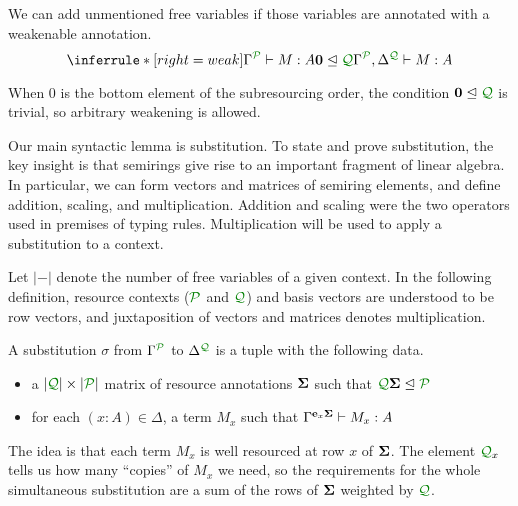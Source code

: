 \begin{lemma}[Weakening]
  \label{lem:weak}
  We can add unmentioned free variables if those variables are annotated with a
  weakenable annotation.
  \[
    \inferrule*[right=weak]{
      \ctx{\Gamma}{P} \vdash M : A
      \\ \vct 0 \subres \resctx Q
    }
    {
      \ctx{\Gamma}{P}, \ctx{\Delta}{Q} \vdash M : A
    }
  \]
\end{lemma}

When $0$ is the bottom element of the subresourcing order, the condition $\vct 0
\subres \resctx Q$ is trivial, so arbitrary weakening is allowed.

Our main syntactic lemma is substitution.
To state and prove substitution, the key insight is that semirings give rise to
an important fragment of linear algebra.
In particular, we can form vectors and matrices of semiring elements, and define
addition, scaling, and multiplication.
Addition and scaling were the two operators used in premises of typing rules.
Multiplication will be used to apply a substitution to a context.


Let $|-|$ denote the number of free variables of a given context.
In the following definition, resource contexts ($\resctx P$ and $\resctx Q$) and
basis vectors are understood to be row vectors, and juxtaposition of vectors and
matrices denotes multiplication.

\begin{definition}
  A substitution $\sigma$ from $\Gamma^{\resctx P}$ to
  $\Delta^{\resctx Q}$ is a tuple with the following data.

  \begin{itemize}
  \item a $|\resctx Q| \times |\resctx P|$ matrix of resource annotations $\mathbf{\Sigma}$ such that $\resctx Q \mat \Sigma \subres \resctx P$
  \item for each $(x:A) \in \Delta$, a term $M_x$ such that
    $\Gamma^{\mathbf{e}_x \mathbf{\Sigma}} \vdash M_x : A$
  \end{itemize}
\end{definition}

The idea is that each term $M_x$ is well resourced at row $x$ of $\mathbf{\Sigma}$.
The element $\resctx Q_x$ tells us how many ``copies'' of $M_x$ we need, so the
requirements for the whole simultaneous substitution are a sum of the rows of
$\mathbf{\Sigma}$ weighted by $\resctx Q$.


